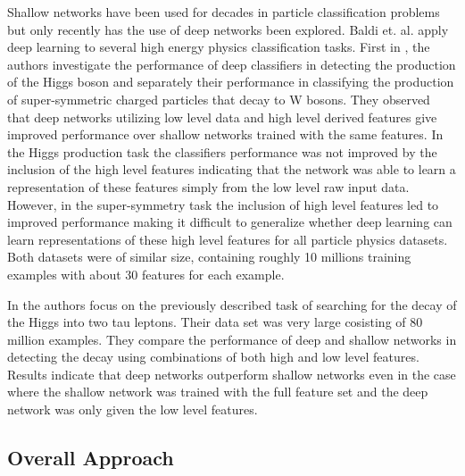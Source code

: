 \documentclass[12pt,letterpaper]{article}
\begin{document}
Shallow networks have been used for decades in particle classification problems but only recently has the use of deep networks been explored.  Baldi et. al. \cite{Baldi:2014kfa}\cite{Baldi:2014pta} apply deep learning to several high energy physics classification tasks.  First in \cite{Baldi:2014kfa}, the authors investigate the performance of deep classifiers in detecting the production of the Higgs boson and separately their performance in classifying the production of super-symmetric charged particles that decay to W bosons.  They observed that deep networks utilizing low level data and high level derived features give improved performance over shallow networks trained with the same features.  In the Higgs production task the classifiers performance was not improved by the inclusion of the high level features indicating that the network was able to learn a representation of these features simply from the low level raw input data.  However, in the super-symmetry task the inclusion of high level features led to improved performance making it difficult to generalize whether deep learning can learn representations of these high level features for all particle physics datasets.  Both datasets were of similar size, containing roughly 10 millions training examples with about 30 features for each example.  

In \cite{Baldi:2014pta} the authors focus on the previously described task of searching for the decay of the Higgs into two tau leptons.  Their data set was very large cosisting of 80 million examples. They compare the performance of deep and shallow networks in detecting the decay using combinations of both high and low level features.  Results indicate that deep networks outperform shallow networks even in the case where the shallow network was trained with the full feature set and the deep network was only given the low level features.

\subsection{Overall Approach}
\end{document}
